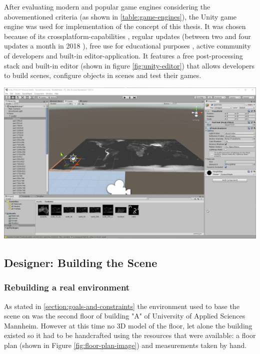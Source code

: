 After evaluating modern and popular game engines considering the abovementioned criteria (as shown in \ref{table:game-engines}), the Unity game engine was used for implementation of the concept of this thesis. It was chosen because of its crossplatform-capabilities \cite{UnityPlatformSupport}, regular updates (between two and four updates a month in 2018 \cite{UnityDownloadArchive}), free use for educational purposes \cite{UnityForEducation}, active community of developers \cite{UnityForum} and built-in editor-application. It features a free post-processing stack \cite{UnityPostProcessingStack} and built-in editor (shown in figure \ref{fig:unity-editor}) that allows developers to build scenes, configure objects in scenes and test their games.
\begin{center}
\noindent\includegraphics[width=14cm]{tex/img/ch05/UnityScreenshot.png}
\label{fig:unity-editor}
\end{center}

\subsection{Designer: Building the Scene}
\subsubsection{Rebuilding a real environment}
As stated in \ref{section:goals-and-constraints} the environment used to base the scene on was the second floor of building "A" of University of Applied Sciences Mannheim. However at this time no 3D model of the floor, let alone the building existed so it had to be handcrafted using the resources that were available: a floor plan (shown in Figure \ref{fig:floor-plan-image}) and measurements taken by hand.
\newlength{\twosubht}
\newsavebox{\twosubbox}

